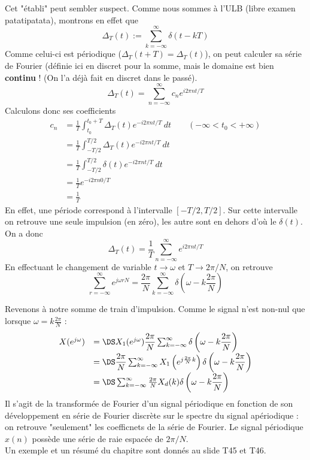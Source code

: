 Cet "établi" peut sembler suspect. Comme nous sommes à l'ULB (libre examen patatipatata), montrons 
en effet que 
\begin{equation}
\Delta_T(t) := \sum_{k=-\infty}^\infty \delta(t-kT)
\end{equation}
Comme celui-ci est périodique ($\Delta_T(t+T)=\Delta_T(t)$), on peut calculer sa série de Fourier 
(définie ici en discret pour la somme, mais le domaine est bien \textbf{continu} ! (On l'a déjà 
fait en discret dans le passé). 
\begin{equation}
\Delta_T(t) = \sum_{n=-\infty}^\infty c_ne^{i2\pi nt/T}
\end{equation}
Calculons donc ses coefficients
\begin{equation}
\begin{split}
c_n &=  \frac{1}{T}\int_{t_0}^{t_0+T} \Delta_T(t)e^{-i2\pi nt/T}\ dt\qquad (-\infty < t_0<+\infty)\\
&= \frac{1}{T}\int_{-T/2}^{T/2} \Delta_T(t)e^{-i2\pi nt/T}\ dt \\
&= \frac{1}{T}\int_{-T/2}^{T/2} \delta(t) e^{-i2\pi nt/T}\ dt \\
&= \frac{1}{T} e^{-i2\pi n0/T}\\
&= \frac{1}{T}
\end{split}
\end{equation}
En effet, une période correspond à l'intervalle $[-T/2,T/2]$. Sur cette intervalle on retrouve une 
seule impulsion (en zéro), les autre sont en dehors d'où le $\delta(t)$. On a donc
\begin{equation}
\Delta_T(t) = \dfrac{1}{T}\sum_{n=-\infty}^\infty e^{i2\pi nt/T}
\end{equation}
En effectuant le changement de variable $t\rightarrow\omega$ et $T\rightarrow 2\pi/N$,  on retrouve
\begin{equation}
\sum_{r=-\infty}^\infty e^{j\omega rN} = \dfrac{2\pi}{N}\sum_{k=-\infty}^\infty \delta\left(\omega-k\frac{2\pi}{N}
\right)
\end{equation}

Revenons à notre somme de train d'impulsion. Comme le signal n'est non-nul que lorsque 
$\omega = k\frac{2\pi}{N}$ :
\begin{equation}
\begin{array}{ll}
X(e^{j\omega}) &= \DS X_1(e^{j\omega})\dfrac{2\pi}{N}\sum_{k=-\infty}^\infty \delta\left(
\omega-k\dfrac{2\pi}{N}\right)\\
&=\DS \dfrac{2\pi}{N}\sum_{k=-\infty}^\infty X_1\left(e^{j\frac{2\pi}{N}k}\right)\delta\left(
\omega-k\dfrac{2\pi}{N}\right)\\
&=\DS \sum_{k=-\infty}^\infty \frac{2\pi}{N} X_d(k)\delta\left(\omega-k\dfrac{2\pi}{N}\right)\\
\end{array}
\end{equation}
Il s'agit de la transformée de Fourier d'un signal périodique en fonction de son développement 
en série de Fourier discrète sur le spectre du signal apériodique : on retrouve "seulement" les 
coefficnets de la série de Fourier. Le signal périodique $x(n)$ possède une série de raie espacée de $2\pi/N$.\\

Un exemple et un résumé du chapitre sont donnés au slide T45 et T46.





